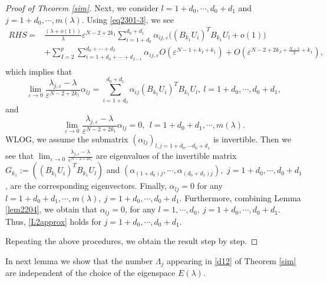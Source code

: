 \documentclass[11pt,reqno]{article}
\numberwithin{equation}{section}
\newcommand\e\varepsilon
\newcommand\la\lambda
\begin{document}
\begin{proof}[Proof of Theorem \ref{sim}]
Next, we consider $l=1+d_0,\cdots,d_0+d_1$ and $j=1+d_0,\cdots,m(\lambda)$. 
Using \eqref{eq2301-3}, we see
\begin{equation}\label{eq1205-3}
\begin{aligned}
      RHS=&
				\frac{(\la+o(1))}{\la }\e^{N-2+2k_1}\sum_{i=1+d_0}^{d_0+d_1}\alpha_{ij,\e}\Bigg((B_{k_1}U_i)^TB_{k_1}U_l+o(1)\Bigg)\\
                &+\sum_{I=2}^p\sum_{i=1+d_0+\cdots+d_{I-1}}^{d_0+\cdots+d_I}\alpha_{ij,\e}O(\e^{N-1+{ k_I}+{ k_1}})+O(\e^{N-2+2k_J+\frac{N-1}{2}+k_1}),\\
                \end{aligned}
\end{equation}
which  implies that 
\begin{equation}
    \lim_{\e\to0}\frac{\lambda_{j,\e}-\lambda}{\e^{N-2+2k_1}}\alpha_{lj}=\sum_{i=1+d_0}^{d_0+d_1}\alpha_{ij}(B_{k_1}U_i)^TB_{k_1}U_l,\  l=1+d_0,\cdots, d_0+d_1,
\end{equation}
and 
\begin{equation}
    \lim_{\e\to0}\frac{\lambda_{j,\e}-\lambda}{\e^{N-2+2k_1}}\alpha_{lj}=0,\ \ l=1+d_0+d_1,\cdots,m(\lambda).
\end{equation}
 WLOG, we assume  the submatrix $(\alpha_{lj})_{l,j=1+d_0,\cdots d_0+d_1}$ is invertible. Then we see that $\lim_{\e\to0}\frac{\lambda_{j,\e}-\lambda}{\e^{N-2+2k_1}}$
 are eigenvalues of the invertible matrix $G_{k_1}:=\left((B_{k_1}U_i)^TB_{k_1}U_l\right)$ and  $(\alpha_{(1+d_0)j},\cdots,\alpha_{(d_0+d_1)j}),$ $ j=1+d_0,\cdots,d_0+d_1$, are the corresponding eigenvectors. Finally, $\alpha_{lj}=0$ for any $  l=1+d_0+d_1,\cdots,m(\lambda),\  j=1+d_0,\cdots,d_0+d_1.$  Furthermore, combining Lemma \ref{lem2204}, we obtain that $\alpha_{lj}=0$, for any $l=1,\cdots,d_0,\  j=1+d_0,\cdots,d_0+d_1.$ Thus, \eqref{L2approx} holds for $j=1+d_0,\cdots,d_0+d_1.$
 
   Repeating the above procedures, we obtain the result step by step.
\end{proof}

In next lemma we show that the number $\Lambda_j$ appearing in \eqref{d12} of Theorem \ref{sim}  are independent of the choice of the eigenspace $E(\la)$.
\end{document}
